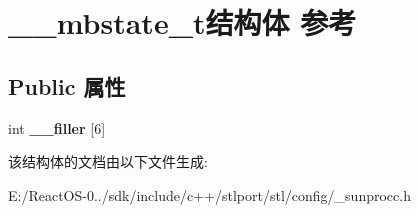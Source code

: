 \hypertarget{struct____mbstate__t}{}\section{\+\_\+\+\_\+mbstate\+\_\+t结构体 参考}
\label{struct____mbstate__t}
\subsection*{Public 属性}
\begin{DoxyCompactItemize}
\item 
\mbox{\label{struct____mbstate__t_a8ec9e6482ff893a4a8a65ae67c01fe3e}} 
int {\bfseries \+\_\+\+\_\+filler} \mbox{[}6\mbox{]}
\end{DoxyCompactItemize}


该结构体的文档由以下文件生成\+:\begin{DoxyCompactItemize}
\item 
E\+:/\+React\+O\+S-\/0../sdk/include/c++/stlport/stl/config/\+\_\+sunprocc.\+h\end{DoxyCompactItemize}
